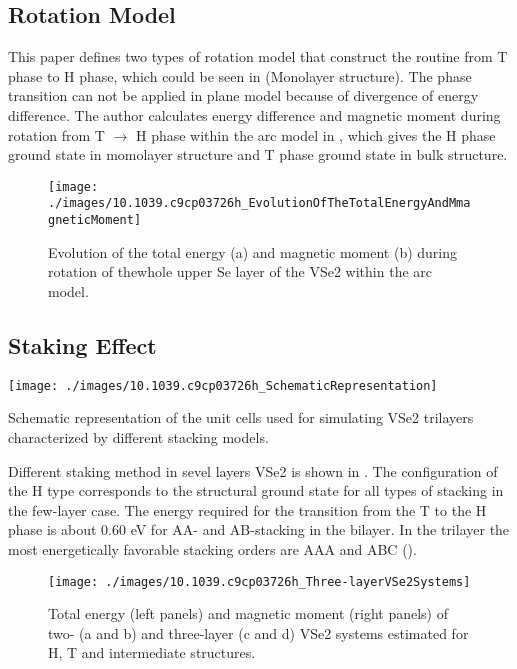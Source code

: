 \subsection{Rotation Model}
This paper defines two types of rotation model that construct the routine from T phase to H phase, which could be seen in (Monolayer structure). The phase transition can not be applied in plane model because of divergence of energy difference. The author calculates energy difference and magnetic moment during rotation from T $\rightarrow$ H phase within the arc model in , which gives the H phase ground state in momolayer structure and T phase ground state in bulk structure.

\begin{figure}[ht] 
    \texttt{[image: ./images/10.1039.c9cp03726h\_EvolutionOfTheTotalEnergyAndMmagneticMoment]}
	\caption[Evolution of the total energy and magnetic moment during rotation for monolayer/bulk VSe2]{
		Evolution of the total energy (a) and magnetic moment (b) during rotation of thewhole upper Se layer of the VSe2 within the arc model.
	}
\end{figure}

\subsection{Staking Effect}
\begin{marginfigure}
    \texttt{[image: ./images/10.1039.c9cp03726h\_SchematicRepresentation]}
	\caption[unit cells used for simulating VSe2 trilayers]{
        Schematic representation of the unit cells used for simulating VSe2 trilayers characterized by different stacking models.
	}
\end{marginfigure}

Different staking method in sevel layers VSe2 is shown in . The configuration of the H type corresponds to the structural ground state for all types of stacking in the few-layer case. The energy required for the transition from the T to the H phase is about 0.60 eV for AA- and AB-stacking in the bilayer. In the trilayer the most energetically favorable stacking orders are AAA and ABC ().

\begin{figure}[ht] 
    \texttt{[image: ./images/10.1039.c9cp03726h\_Three-layerVSe2Systems]}
	\caption[Total energy and magnetic moment of two- and three-layer VSe2 systems]{
		Total energy (left panels) and magnetic moment (right panels) of two- (a and b) and three-layer (c and d) VSe2 systems estimated for H, T and intermediate structures.
	}
\end{figure}

